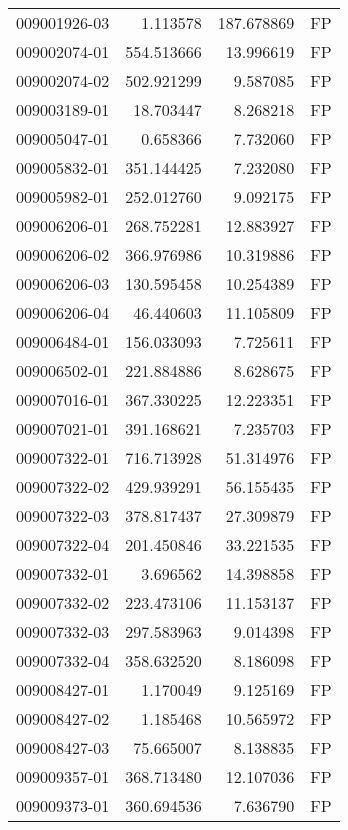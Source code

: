 \begin{tabular}{lrrl}
009001926-03 &    1.113578 &     187.678869 &   FP \\
009002074-01 &  554.513666 &      13.996619 &   FP \\
009002074-02 &  502.921299 &       9.587085 &   FP \\
009003189-01 &   18.703447 &       8.268218 &   FP \\
009005047-01 &    0.658366 &       7.732060 &   FP \\
009005832-01 &  351.144425 &       7.232080 &   FP \\
009005982-01 &  252.012760 &       9.092175 &   FP \\
009006206-01 &  268.752281 &      12.883927 &   FP \\
009006206-02 &  366.976986 &      10.319886 &   FP \\
009006206-03 &  130.595458 &      10.254389 &   FP \\
009006206-04 &   46.440603 &      11.105809 &   FP \\
009006484-01 &  156.033093 &       7.725611 &   FP \\
009006502-01 &  221.884886 &       8.628675 &   FP \\
009007016-01 &  367.330225 &      12.223351 &   FP \\
009007021-01 &  391.168621 &       7.235703 &   FP \\
009007322-01 &  716.713928 &      51.314976 &   FP \\
009007322-02 &  429.939291 &      56.155435 &   FP \\
009007322-03 &  378.817437 &      27.309879 &   FP \\
009007322-04 &  201.450846 &      33.221535 &   FP \\
009007332-01 &    3.696562 &      14.398858 &   FP \\
009007332-02 &  223.473106 &      11.153137 &   FP \\
009007332-03 &  297.583963 &       9.014398 &   FP \\
009007332-04 &  358.632520 &       8.186098 &   FP \\
009008427-01 &    1.170049 &       9.125169 &   FP \\
009008427-02 &    1.185468 &      10.565972 &   FP \\
009008427-03 &   75.665007 &       8.138835 &   FP \\
009009357-01 &  368.713480 &      12.107036 &   FP \\
009009373-01 &  360.694536 &       7.636790 &   FP \\

\end{tabular}
